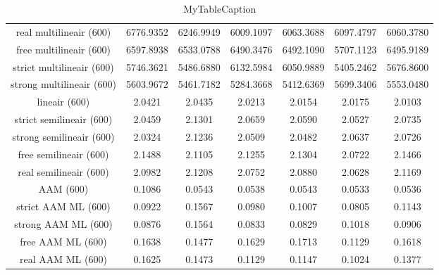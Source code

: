 \begin{table}
\centering
\begin{tabular}{|c|c|c|c|c|c|c|}
\hline
 &  &  &  &  &  &  \\
\hline
real multilineair (600) & 6776.9352 & 6246.9949 & 6009.1097 & 6063.3688 & 6097.4797 & 6060.3780 \\
\hline
free multilineair (600) & 6597.8938 & 6533.0788 & 6490.3476 & 6492.1090 & 5707.1123 & 6495.9189 \\
\hline
strict multilineair (600) & 5746.3621 & 5486.6880 & 6132.5984 & 6050.9889 & 5405.2462 & 5676.8600 \\
\hline
strong multilineair (600) & 5603.9672 & 5461.7182 & 5284.3668 & 5412.6369 & 5699.3406 & 5553.0480 \\
\hline
lineair (600) & 2.0421 & 2.0435 & 2.0213 & 2.0154 & 2.0175 & 2.0103 \\
\hline
strict semilineair (600) & 2.0459 & 2.1301 & 2.0659 & 2.0590 & 2.0527 & 2.0735 \\
\hline
strong semilineair (600) & 2.0324 & 2.1236 & 2.0509 & 2.0482 & 2.0637 & 2.0726 \\
\hline
free semilineair (600) & 2.1488 & 2.1105 & 2.1255 & 2.1304 & 2.0722 & 2.1466 \\
\hline
real semilineair (600) & 2.0982 & 2.1208 & 2.0752 & 2.0880 & 2.0628 & 2.1169 \\
\hline
AAM (600) & 0.1086 & 0.0543 & 0.0538 & 0.0543 & 0.0533 & 0.0536 \\
\hline
strict AAM ML (600) & 0.0922 & 0.1567 & 0.0980 & 0.1007 & 0.0805 & 0.1143 \\
\hline
strong AAM ML (600) & 0.0876 & 0.1564 & 0.0833 & 0.0829 & 0.1018 & 0.0906 \\
\hline
free AAM ML (600) & 0.1638 & 0.1477 & 0.1629 & 0.1713 & 0.1129 & 0.1618 \\
\hline
real AAM ML (600) & 0.1625 & 0.1473 & 0.1129 & 0.1147 & 0.1024 & 0.1377 \\
\hline
\end{tabular}
\caption{MyTableCaption}
\label{table:MyTableLabel}
\end{table}
